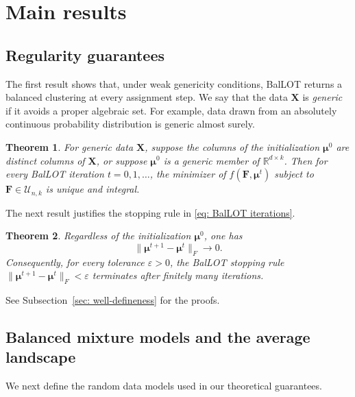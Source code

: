 \documentclass{article}
\theoremstyle{plain}
\newtheorem{theorem}{Theorem}
\theoremstyle{definition}
\newcommand{\1}{\mathbf{1}}
\newcommand{\Rdk}{\mathbb{R}^{d\times k}}
\newcommand{\bUnk}{\mathcal{U}_{n,k}}
\newcommand{\bmF}{\bm{F}}
\newcommand{\bmu}{\bm{\mu}}
\begin{document}

\section{Main results}\label{sec: main results}

\subsection{Regularity guarantees}
\label{sec: algorithmic guarantees}

The first result shows that, under weak genericity conditions, BalLOT returns a balanced clustering at every assignment step.
We say that the data $\bm{X}$ is \textit{generic} if it avoids a proper algebraic set.
For example, data drawn from an absolutely continuous probability distribution is generic almost surely.

\begin{theorem}
\label{thm.BalLOT is well defined}
For generic data $\bm{X}$, suppose the columns of the initialization $\bmu^0$ are distinct columns of $\bm{X}$, or suppose $\bmu^0$ is a generic member of $\Rdk$.
Then for every BalLOT iteration $t=0,1,\ldots$, the minimizer of $f(\bmF,\bmu^t)$ subject to $\bmF\in\bUnk$ is unique and integral.
\end{theorem}

The next result justifies the stopping rule in \eqref{eq: BalLOT iterations}.

\begin{theorem}
\label{thm.finite termination}
Regardless of the initialization $\bmu^0$, one has
\[
\|\bmu^{t+1}-\bmu^t\|_F\longrightarrow0.
\]
Consequently, for every tolerance $\varepsilon>0$, the BalLOT stopping rule $\|\bmu^{t+1}-\bmu^t\|_F<\varepsilon$ terminates after finitely many iterations.
\end{theorem}

See Subsection~\ref{sec: well-defineness} for the proofs.

\subsection{Balanced mixture models and the average landscape}
\label{sec: global average landscape}

We next define the random data models used in our theoretical guarantees.
\end{document}
